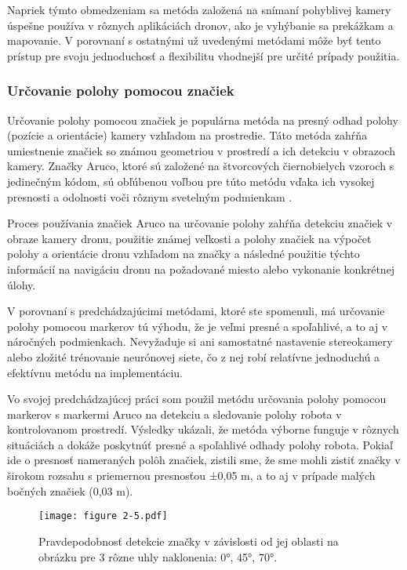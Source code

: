 Napriek týmto obmedzeniam sa metóda založená na snímaní pohyblivej kamery úspešne používa v rôznych aplikáciách dronov, ako je vyhýbanie sa prekážkam a mapovanie. V porovnaní s ostatnými už uvedenými metódami môže byť tento prístup pre svoju jednoduchosť a flexibilitu vhodnejší pre určité prípady použitia.

\subsubsection{Určovanie polohy pomocou značiek}
Určovanie polohy pomocou značiek je populárna metóda na presný odhad polohy (pozície a orientácie) kamery vzhľadom na prostredie. Táto metóda zahŕňa umiestnenie značiek so známou geometriou v prostredí a ich detekciu v obrazoch kamery. Značky Aruco, ktoré sú založené na štvorcových čiernobielych vzoroch s jedinečným kódom, sú obľúbenou voľbou pre túto metódu vďaka ich vysokej presnosti a odolnosti voči rôznym svetelným podmienkam \citep{Marut2019}.

Proces používania značiek Aruco na určovanie polohy zahŕňa detekciu značiek v obraze kamery dronu, použitie známej veľkosti a polohy značiek na výpočet polohy a orientácie dronu vzhľadom na značky a následné použitie týchto informácií na navigáciu dronu na požadované miesto alebo vykonanie konkrétnej úlohy.

V porovnaní s predchádzajúcimi metódami, ktoré ste spomenuli, má určovanie polohy pomocou markerov tú výhodu, že je veľmi presné a spoľahlivé, a to aj v náročných podmienkach. Nevyžaduje si ani samostatné nastavenie stereokamery alebo zložité trénovanie neurónovej siete, čo z nej robí relatívne jednoduchú a efektívnu metódu na implementáciu. 

Vo svojej predchádzajúcej práci som použil metódu určovania polohy pomocou markerov s markermi Aruco na detekciu a sledovanie polohy robota v kontrolovanom prostredí. Výsledky ukázali, že metóda výborne funguje v rôznych situáciách a dokáže poskytnúť presné a spoľahlivé odhady polohy robota. Pokiaľ ide o presnosť nameraných polôh značiek, zistili sme, že sme mohli zistiť značky v širokom rozsahu s priemernou presnosťou ±0,05 m, a to aj v prípade malých bočných značiek (0,03 m). 

\begin{figure}[ht!]
    \centering 
    \texttt{[image: figure 2-5.pdf]}
    \caption{Pravdepodobnosť detekcie značky v závislosti od jej oblasti na obrázku pre 3 rôzne uhly naklonenia: 0°, 45°, 70°.}
    \label{o:2-5}
\end{figure}

